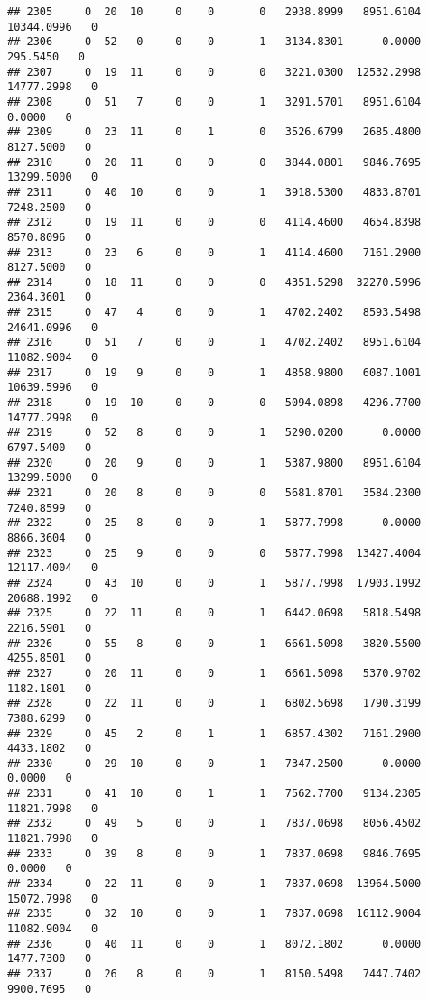 \documentclass[
]{article}
\begin{document}
\begin{enumerate}
\begin{verbatim}
## 2305     0  20  10     0    0       0   2938.8999   8951.6104  10344.0996   0
## 2306     0  52   0     0    0       1   3134.8301      0.0000    295.5450   0
## 2307     0  19  11     0    0       0   3221.0300  12532.2998  14777.2998   0
## 2308     0  51   7     0    0       1   3291.5701   8951.6104      0.0000   0
## 2309     0  23  11     0    1       0   3526.6799   2685.4800   8127.5000   0
## 2310     0  20  11     0    0       0   3844.0801   9846.7695  13299.5000   0
## 2311     0  40  10     0    0       1   3918.5300   4833.8701   7248.2500   0
## 2312     0  19  11     0    0       0   4114.4600   4654.8398   8570.8096   0
## 2313     0  23   6     0    0       1   4114.4600   7161.2900   8127.5000   0
## 2314     0  18  11     0    0       0   4351.5298  32270.5996   2364.3601   0
## 2315     0  47   4     0    0       1   4702.2402   8593.5498  24641.0996   0
## 2316     0  51   7     0    0       1   4702.2402   8951.6104  11082.9004   0
## 2317     0  19   9     0    0       1   4858.9800   6087.1001  10639.5996   0
## 2318     0  19  10     0    0       0   5094.0898   4296.7700  14777.2998   0
## 2319     0  52   8     0    0       1   5290.0200      0.0000   6797.5400   0
## 2320     0  20   9     0    0       1   5387.9800   8951.6104  13299.5000   0
## 2321     0  20   8     0    0       0   5681.8701   3584.2300   7240.8599   0
## 2322     0  25   8     0    0       1   5877.7998      0.0000   8866.3604   0
## 2323     0  25   9     0    0       0   5877.7998  13427.4004  12117.4004   0
## 2324     0  43  10     0    0       1   5877.7998  17903.1992  20688.1992   0
## 2325     0  22  11     0    0       1   6442.0698   5818.5498   2216.5901   0
## 2326     0  55   8     0    0       1   6661.5098   3820.5500   4255.8501   0
## 2327     0  20  11     0    0       1   6661.5098   5370.9702   1182.1801   0
## 2328     0  22  11     0    0       1   6802.5698   1790.3199   7388.6299   0
## 2329     0  45   2     0    1       1   6857.4302   7161.2900   4433.1802   0
## 2330     0  29  10     0    0       1   7347.2500      0.0000      0.0000   0
## 2331     0  41  10     0    1       1   7562.7700   9134.2305  11821.7998   0
## 2332     0  49   5     0    0       1   7837.0698   8056.4502  11821.7998   0
## 2333     0  39   8     0    0       1   7837.0698   9846.7695      0.0000   0
## 2334     0  22  11     0    0       1   7837.0698  13964.5000  15072.7998   0
## 2335     0  32  10     0    0       1   7837.0698  16112.9004  11082.9004   0
## 2336     0  40  11     0    0       1   8072.1802      0.0000   1477.7300   0
## 2337     0  26   8     0    0       1   8150.5498   7447.7402   9900.7695   0

\end{verbatim}
\end{enumerate}
\end{document}

